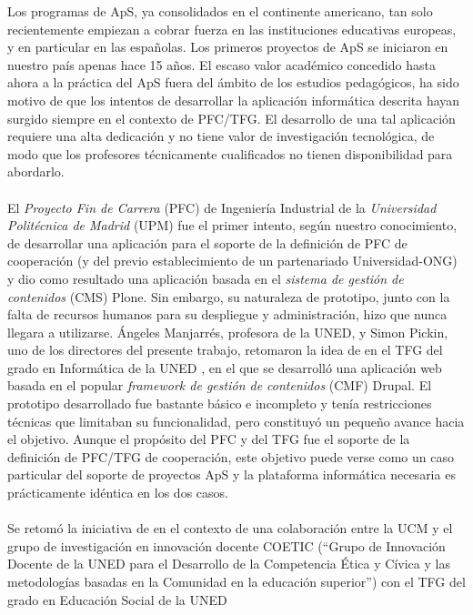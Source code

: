 \documentclass[11pt]{book}
\begin{document}
Los programas de ApS, ya consolidados en el continente americano, tan
solo recientemente empiezan a cobrar fuerza en las instituciones
educativas europeas, y en particular en las españolas. Los primeros
proyectos de ApS se iniciaron en nuestro país apenas hace 15 años.  El
escaso valor académico concedido hasta ahora a la práctica del ApS fuera
del ámbito de los estudios pedagógicos, ha sido motivo de que los
intentos de desarrollar la aplicación informática descrita hayan surgido
siempre en el contexto de PFC/TFG. El desarrollo de una tal aplicación
requiere una alta dedicación y no tiene valor de investigación
tecnológica, de modo que los profesores técnicamente cualificados no
tienen disponibilidad para abordarlo.\\\\

El \emph{Proyecto Fin de Carrera} (PFC) de Ingeniería Industrial de la
\emph{Universidad Politécnica de Madrid} (UPM) \cite{ref1} fue el primer intento, según
nuestro conocimiento, de desarrollar una aplicación para el soporte de
la definición de PFC de cooperación (y del previo establecimiento de un
partenariado Universidad-ONG) y dio como resultado una aplicación basada
en el \emph{sistema de gestión de contenidos} (CMS) Plone. Sin embargo, su
naturaleza de prototipo, junto con la falta de recursos humanos para su
despliegue y administración, hizo que nunca llegara a utilizarse.
Ángeles Manjarrés, profesora de la UNED, y Simon Pickin, uno de los directores del presente
trabajo, retomaron la idea de \cite{ref1} en el TFG del grado en Informática de
la UNED \cite{ref2}, en el que se desarrolló una aplicación web basada en el
popular \emph{framework de gestión de contenidos} (CMF) Drupal. El prototipo
desarrollado fue bastante básico e incompleto y tenía restricciones
técnicas que limitaban su funcionalidad, pero constituyó un pequeño
avance hacia el objetivo. Aunque el propósito del PFC \cite{ref1} y del TFG \cite{ref2}
fue el soporte de la definición de PFC/TFG de cooperación, este objetivo
puede verse como un caso particular del soporte de proyectos ApS y la
plataforma informática necesaria es prácticamente idéntica en los dos casos.
\\\\
Se retomó la iniciativa de \cite{ref2} en el contexto de una colaboración entre
la UCM y el grupo de investigación en innovación docente COETIC (“Grupo
de Innovación Docente de la UNED para el Desarrollo de la Competencia
Ética y Cívica y las metodologías basadas en la Comunidad en la
educación superior”) con el TFG del grado en Educación Social de la UNED
\end{document}
